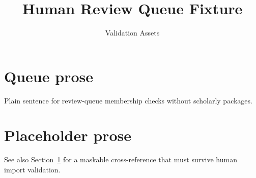 \documentclass[11pt]{article}
\title{Human Review Queue Fixture}
\author{Validation Assets}
\date{}
\begin{document}
\maketitle

\section{Queue prose}
\label{sec:queue}

Plain sentence for review-queue membership checks without scholarly packages.

\section{Placeholder prose}
\label{sec:ph}

See also Section~\ref{sec:queue} for a maskable cross-reference that must survive
human import validation.
\end{document}
